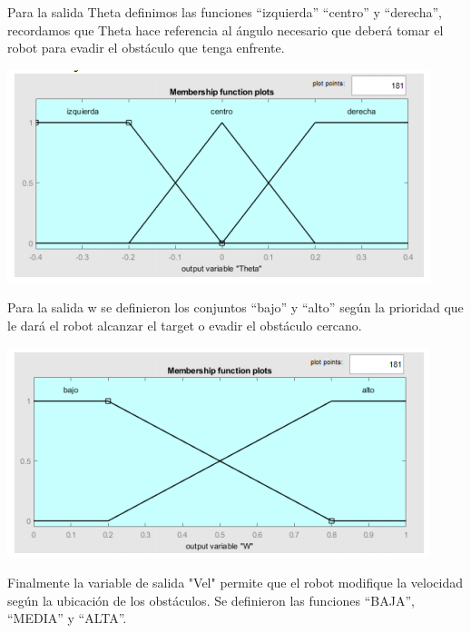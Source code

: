 Para la salida Theta definimos las funciones “izquierda” “centro” y “derecha”, recordamos que Theta hace referencia al ángulo necesario que deberá tomar el robot para evadir el obstáculo que tenga enfrente.

\begin{center}
    \includegraphics[scale=0.5]{Tesis/Capitulos/04_CAPITULO_2/img/varfuzzy2.png}
\end{center}

Para la salida w se definieron los conjuntos “bajo” y “alto” según la prioridad que le dará el robot alcanzar el target o evadir el obstáculo cercano.

\begin{center}
    \includegraphics[scale=0.5]{Tesis/Capitulos/04_CAPITULO_2/img/varfuzzy3.png}
\end{center}

Finalmente la variable de salida "Vel" permite que el robot modifique la velocidad según la ubicación de los obstáculos. Se definieron las funciones “BAJA”, “MEDIA” y “ALTA”. 

